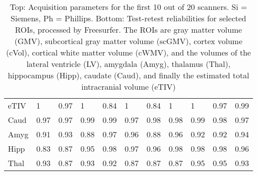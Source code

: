 \begin{table}
\begin{tabular}{lllllllllll}
eTIV &      1 &   0.97 &      1 &   0.84 &                     1 &   0.84 &                     1 &      1 &   0.97 &   0.99 \\
Caud                       &   0.97 &   0.97 &   0.99 &   0.99 &                  0.97 &   0.98 &                  0.98 &   0.99 &   0.98 &   0.97 \\
Amyg                      &   0.91 &   0.93 &   0.88 &   0.97 &                  0.96 &   0.88 &                  0.96 &   0.92 &   0.92 &   0.94 \\
Hipp                   &   0.83 &   0.87 &   0.95 &   0.98 &                  0.97 &   0.96 &                  0.98 &   0.98 &   0.98 &   0.96 \\
Thal               &   0.93 &   0.87 &   0.93 &   0.92 &                  0.87 &   0.87 &                  0.87 &   0.95 &   0.95 &   0.93 \\
\bottomrule
\end{tabular}
\caption{Top: Acquisition parameters for the first 10 out of 20 scanners. Si = Siemens, Ph = Phillips. Bottom: Test-retest reliabilities for selected ROIs, processed by Freesurfer. The ROIs are gray matter volume (GMV), subcortical gray matter volume (scGMV), cortex volume (cVol), cortical white matter volume (cWMV), and the volumes of the lateral ventricle (LV), amygdala (Amyg), thalamus (Thal), hippocampus (Hipp), caudate (Caud), and finally the estimated total intracranial volume (eTIV)} 
\label{tab:acquisition1}

\end{table}